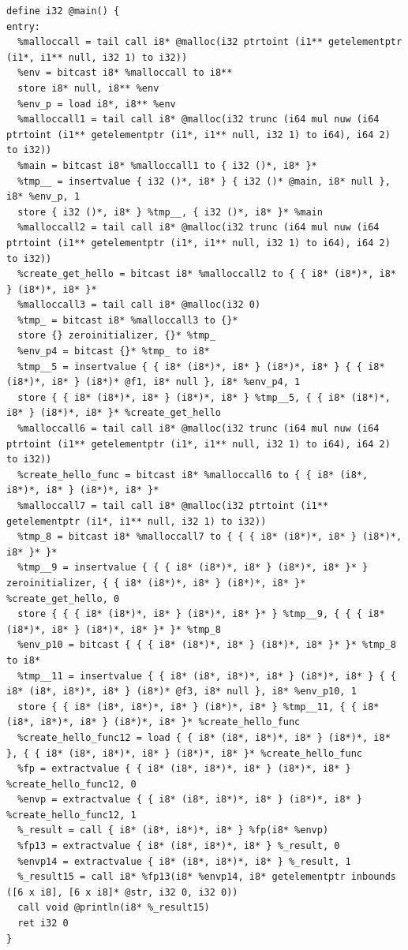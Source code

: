 \documentclass[12pt]{article}
\begin{document}
\begin{mdframed}[hidealllines=true,backgroundcolor=green!10]
\begin{lstlisting}
define i32 @main() {
entry:
  %malloccall = tail call i8* @malloc(i32 ptrtoint (i1** getelementptr (i1*, i1** null, i32 1) to i32))
  %env = bitcast i8* %malloccall to i8**
  store i8* null, i8** %env
  %env_p = load i8*, i8** %env
  %malloccall1 = tail call i8* @malloc(i32 trunc (i64 mul nuw (i64 ptrtoint (i1** getelementptr (i1*, i1** null, i32 1) to i64), i64 2) to i32))
  %main = bitcast i8* %malloccall1 to { i32 ()*, i8* }*
  %tmp__ = insertvalue { i32 ()*, i8* } { i32 ()* @main, i8* null }, i8* %env_p, 1
  store { i32 ()*, i8* } %tmp__, { i32 ()*, i8* }* %main
  %malloccall2 = tail call i8* @malloc(i32 trunc (i64 mul nuw (i64 ptrtoint (i1** getelementptr (i1*, i1** null, i32 1) to i64), i64 2) to i32))
  %create_get_hello = bitcast i8* %malloccall2 to { { i8* (i8*)*, i8* } (i8*)*, i8* }*
  %malloccall3 = tail call i8* @malloc(i32 0)
  %tmp_ = bitcast i8* %malloccall3 to {}*
  store {} zeroinitializer, {}* %tmp_
  %env_p4 = bitcast {}* %tmp_ to i8*
  %tmp__5 = insertvalue { { i8* (i8*)*, i8* } (i8*)*, i8* } { { i8* (i8*)*, i8* } (i8*)* @f1, i8* null }, i8* %env_p4, 1
  store { { i8* (i8*)*, i8* } (i8*)*, i8* } %tmp__5, { { i8* (i8*)*, i8* } (i8*)*, i8* }* %create_get_hello
  %malloccall6 = tail call i8* @malloc(i32 trunc (i64 mul nuw (i64 ptrtoint (i1** getelementptr (i1*, i1** null, i32 1) to i64), i64 2) to i32))
  %create_hello_func = bitcast i8* %malloccall6 to { { i8* (i8*, i8*)*, i8* } (i8*)*, i8* }*
  %malloccall7 = tail call i8* @malloc(i32 ptrtoint (i1** getelementptr (i1*, i1** null, i32 1) to i32))
  %tmp_8 = bitcast i8* %malloccall7 to { { { i8* (i8*)*, i8* } (i8*)*, i8* }* }*
  %tmp__9 = insertvalue { { { i8* (i8*)*, i8* } (i8*)*, i8* }* } zeroinitializer, { { i8* (i8*)*, i8* } (i8*)*, i8* }* %create_get_hello, 0
  store { { { i8* (i8*)*, i8* } (i8*)*, i8* }* } %tmp__9, { { { i8* (i8*)*, i8* } (i8*)*, i8* }* }* %tmp_8
  %env_p10 = bitcast { { { i8* (i8*)*, i8* } (i8*)*, i8* }* }* %tmp_8 to i8*
  %tmp__11 = insertvalue { { i8* (i8*, i8*)*, i8* } (i8*)*, i8* } { { i8* (i8*, i8*)*, i8* } (i8*)* @f3, i8* null }, i8* %env_p10, 1
  store { { i8* (i8*, i8*)*, i8* } (i8*)*, i8* } %tmp__11, { { i8* (i8*, i8*)*, i8* } (i8*)*, i8* }* %create_hello_func
  %create_hello_func12 = load { { i8* (i8*, i8*)*, i8* } (i8*)*, i8* }, { { i8* (i8*, i8*)*, i8* } (i8*)*, i8* }* %create_hello_func
  %fp = extractvalue { { i8* (i8*, i8*)*, i8* } (i8*)*, i8* } %create_hello_func12, 0
  %envp = extractvalue { { i8* (i8*, i8*)*, i8* } (i8*)*, i8* } %create_hello_func12, 1
  %_result = call { i8* (i8*, i8*)*, i8* } %fp(i8* %envp)
  %fp13 = extractvalue { i8* (i8*, i8*)*, i8* } %_result, 0
  %envp14 = extractvalue { i8* (i8*, i8*)*, i8* } %_result, 1
  %_result15 = call i8* %fp13(i8* %envp14, i8* getelementptr inbounds ([6 x i8], [6 x i8]* @str, i32 0, i32 0))
  call void @println(i8* %_result15)
  ret i32 0
}


\end{lstlisting}
\end{mdframed}
\end{document}
